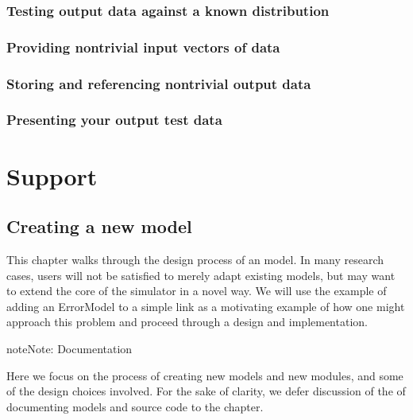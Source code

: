 \documentclass[letterpaper,10pt,english]{sphinxmanual}
\begin{document}
\subsection{Testing output data against a known distribution}
\label{\detokenize{how-to-write-tests:testing-output-data-against-a-known-distribution}}

\subsection{Providing non\sphinxhyphen{}trivial input vectors of data}
\label{\detokenize{how-to-write-tests:providing-non-trivial-input-vectors-of-data}}

\subsection{Storing and referencing non\sphinxhyphen{}trivial output data}
\label{\detokenize{how-to-write-tests:storing-and-referencing-non-trivial-output-data}}

\subsection{Presenting your output test data}
\label{\detokenize{how-to-write-tests:presenting-your-output-test-data}}

\chapter{Support}
\label{\detokenize{support:support}}\label{\detokenize{support::doc}}

\section{Creating a new  model}
\label{\detokenize{new-models:creating-a-new-ns3-model}}\label{\detokenize{new-models::doc}}
This chapter walks through the design process of an  model.  In many
research cases, users will not be satisfied to merely adapt existing models, but
may want to extend the core of the simulator in a novel way. We will use the
example of adding an ErrorModel to a simple  link as a motivating example
of how one might approach this problem and proceed through a design and
implementation.

\begin{sphinxadmonition}{note}{Note:}
Documentation

Here we focus on the process of creating new models
and new modules, and some of the design choices involved.
For the sake of clarity, we defer discussion of the
 of documenting models and source code to the
{\hyperref[\detokenize{documentation::doc}]{}} chapter.
\end{sphinxadmonition}
\end{document}

